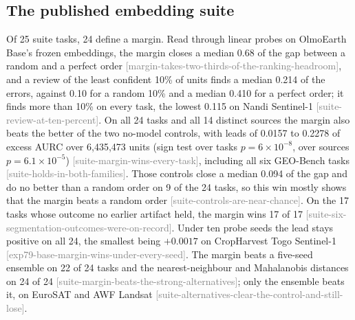 \documentclass[11pt,a4paper]{article}
\newcommand{\claim}[1]{{\scriptsize\textsf{\textcolor{gray}{[#1]}}}}
\begin{document}
\subsection{The published embedding suite}
\label{sec:res-suite}

Of 25 suite tasks, 24 define a margin. Read through linear probes on OlmoEarth Base's frozen embeddings, the margin
closes a median 0.68 of the gap between a random and a perfect order \claim{margin-takes-two-thirds-of-the-ranking-headroom},
and a review of the least confident 10\% of units finds a median 0.214 of the errors, against 0.10 for a random 10\% and
a median 0.410 for a perfect order; it finds more than 10\% on every task, the lowest 0.115 on Nandi Sentinel-1
\claim{suite-review-at-ten-percent}. On all 24 tasks and all 14 distinct sources the margin also beats the better of
the two no-model controls, with leads of 0.0157 to 0.2278 of excess AURC over 6,435,473 units (sign test over tasks
$p = 6\times10^{-8}$, over sources $p = 6.1\times10^{-5}$) \claim{suite-margin-wins-every-task}, including all six GEO-Bench tasks \citep{lacoste2023}
\claim{suite-holds-in-both-families}. Those controls close a median 0.094 of the gap and do no better than a random
order on 9 of the 24 tasks, so this win mostly shows that the margin beats a random order
\claim{suite-controls-are-near-chance}. On the 17 tasks whose outcome no earlier artifact held, the margin wins 17 of 17
\claim{suite-six-segmentation-outcomes-were-on-record}. Under ten probe seeds the lead stays positive on all 24, the
smallest being $+0.0017$ on CropHarvest Togo Sentinel-1 \claim{exp79-base-margin-wins-under-every-seed}. The margin
beats a five-seed ensemble \citep{lakshminarayanan2017} on 22 of 24 tasks and the nearest-neighbour \citep{sun2022} and
Mahalanobis \citep{lee2018} distances on 24 of 24 \claim{suite-margin-beats-the-strong-alternatives}; only the ensemble
beats it, on EuroSAT and AWF Landsat \claim{suite-alternatives-clear-the-control-and-still-lose}.
\end{document}
